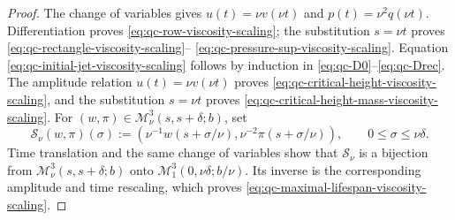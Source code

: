 \begin{proof}
The change of variables gives
\(u(t)=\nu v(\nu t)\) and \(p(t)=\nu^2q(\nu t)\).
Differentiation proves \eqref{eq:qc-row-viscosity-scaling}; the substitution
\(s=\nu t\) proves
\eqref{eq:qc-rectangle-viscosity-scaling}--%
\eqref{eq:qc-pressure-sup-viscosity-scaling}.
Equation \eqref{eq:qc-initial-jet-viscosity-scaling} follows by induction in
\eqref{eq:qc-D0}--\eqref{eq:qc-Drec}.  The amplitude relation
\(u(t)=\nu v(\nu t)\) proves
\eqref{eq:qc-critical-height-viscosity-scaling}, and the substitution
\(s=\nu t\) proves
\eqref{eq:qc-critical-height-mass-viscosity-scaling}.  For
\((w,\pi)\in\mathscr M_\nu^3(s,s+\delta;b)\), set
\[
 \mathcal S_\nu(w,\pi)(\sigma)
 :=
 \left(
  \nu^{-1}w(s+\sigma/\nu),
  \nu^{-2}\pi(s+\sigma/\nu)
 \right),
 \qquad 0\le\sigma\le\nu\delta.
\]
Time translation and the same change of variables show that
\(\mathcal S_\nu\) is a bijection from
\(\mathscr M_\nu^3(s,s+\delta;b)\) onto
\(\mathscr M_1^3(0,\nu\delta;b/\nu)\).
Its inverse is the corresponding amplitude and time rescaling,
which proves \eqref{eq:qc-maximal-lifespan-viscosity-scaling}.
\end{proof}

